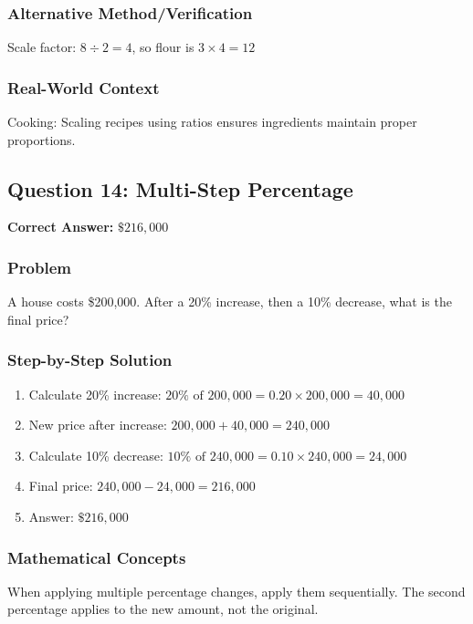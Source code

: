 \documentclass[12pt,a4paper]{article}
\begin{document}
\subsubsection*{Alternative Method/Verification}
Scale factor: $8 \div 2 = 4$, so flour is $3 \times 4 = 12$ 

\subsubsection*{Real-World Context}
Cooking: Scaling recipes using ratios ensures ingredients maintain proper proportions.

\vspace{0.5cm}

\subsection*{Question 14: Multi-Step Percentage}

\textbf{Correct Answer:} $\$216,000$

\subsubsection*{Problem}
A house costs \$200,000. After a 20\% increase, then a 10\% decrease, what is the final price?

\subsubsection*{Step-by-Step Solution}
\begin{enumerate}
    \item Calculate 20\% increase: $20\% \text{ of } 200,000 = 0.20 \times 200,000 = 40,000$
    \item New price after increase: $200,000 + 40,000 = 240,000$
    \item Calculate 10\% decrease: $10\% \text{ of } 240,000 = 0.10 \times 240,000 = 24,000$
    \item Final price: $240,000 - 24,000 = 216,000$
    \item Answer: $\$216,000$
\end{enumerate}

\subsubsection*{Mathematical Concepts}
When applying multiple percentage changes, apply them sequentially. The second percentage applies to the new amount, not the original.
\end{document}
